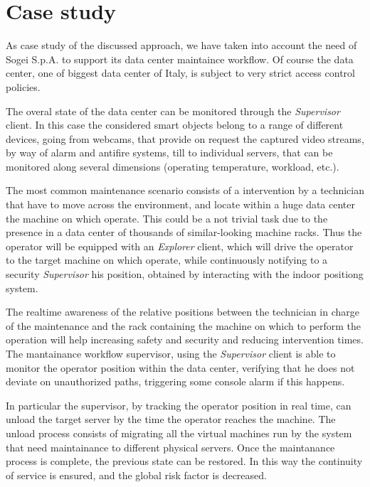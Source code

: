 \section{Case study}\label{case-study}

As case study of the discussed approach, we have taken into account the need of Sogei S.p.A. to support its data center maintaince workflow. Of course the data center, one of biggest data center of Italy, is subject to very strict access control policies. 

The overal state of the data center can be monitored through the \emph{Supervisor} client. In this case the considered smart objects belong to a range of different devices, going from webcams, that provide on request the captured video streams, by way of alarm and antifire systems, till to individual servers, that can be monitored along several dimensions (operating temperature, workload, etc.). 

The most common maintenance scenario consists of a intervention by a technician that have to move across the environment, and locate within a huge data center the machine on which operate. This could be a not trivial task due to the presence in a data center of thousands of similar-looking machine racks. Thus the operator will be equipped with an \emph{Explorer} client, which will drive the operator to the target machine on which operate, while continuously notifying to a security \emph{Supervisor} his position, obtained by interacting with the indoor positiong system.

The real­time awareness of the relative positions between the technician in charge of the maintenance and the rack ­containing the machine­ on which to perform the operation will help increasing safety and security and reducing intervention times. The mantainance workflow supervisor, using the \emph{Supervisor} client is able to monitor the operator position within the data center, verifying that he does not deviate on unauthorized paths, triggering some console alarm if this happens.

In particular the supervisor, by tracking the operator position in real time, can unload the target server by the time the operator reaches the machine. The unload process consists of migrating all the virtual machines run by the system that need maintainance to different physical servers. Once the maintanance process is complete, the previous state can be restored. In this way the continuity of service is ensured, and the global risk factor is decreased.


